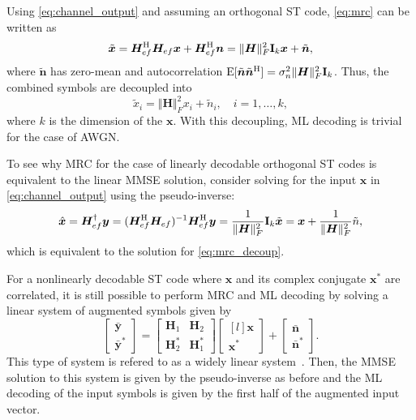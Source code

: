 Using \eqref{eq:channel_output} and assuming an orthogonal ST code, \eqref{eq:mrc} can be written as
\[ \tilde{\bm{x}} = \bm{H}_{ef}^\text{H}\bm{H}_{ef}\bm{x} + \bm{H}_{ef}^\text{H}\bm{n} = \Vert\bm{H}\Vert_F^2 \mathbf{I}_k \bm{x} + \tilde{\bm{n}}, \]
where $\tilde{\bm{n}}$ has zero-mean and autocorrelation $\operatorname{E}[\tilde{\bm{n}}\tilde{\bm{n}}^\text{H}] = \sigma_n^2\Vert\bm{H}\Vert_F^2\mathbf{I}_k$. Thus, the combined symbols are decoupled into
\begin{equation}
  \tilde{x}_i = \Vert\bm{H}\Vert_F^2 x_i + \tilde{n}_i, \quad i=1,\dots,k,
  \label{eq:mrc_decoup}
\end{equation}
where $k$ is the dimension of the $\bm{x}$. With this decoupling, ML decoding is trivial for the case of AWGN.

To see why MRC for the case of linearly decodable orthogonal ST codes is equivalent to the linear MMSE solution, consider solving for the input $\bm{x}$ in \eqref{eq:channel_output} using the pseudo-inverse:
\[ \hat{\bm{x}} = \bm{H}_{ef}^\dagger \bm{y} = (\bm{H}_{ef}^\text{H}\bm{H}_{ef})^{-1}\bm{H}_{ef}^\text{H} \bm{y} = \frac{1}{\Vert\bm{H}\Vert_F^2} \mathbf{I}_k \tilde{\bm{x}} = \bm{x} + \frac{1}{\Vert\bm{H}\Vert_F^2} \tilde{n}, \]
which is equivalent to the solution for \eqref{eq:mrc_decoup}.

For a nonlinearly decodable ST code where $\bm{x}$ and its complex conjugate $\bm{x}^\ast$ are correlated, it is still possible to perform MRC and ML decoding by solving a linear system of augmented symbols given by
\[ \begin{bmatrix} \bar{\bm{y}} \\ \bar{\bm{y}}^\ast \end{bmatrix}
= \begin{bmatrix} \bm{H}_1 & \bm{H}_2 \\ \bm{H}_2^\ast & \bm{H}_1^\ast \end{bmatrix}
\begin{bmatrix*}[l] \bm{x} \\ \bm{x}^\ast\end{bmatrix*} + \begin{bmatrix} \bar{\bm{n}} \\ \bar{\bm{n}}^\ast \end{bmatrix} . \]
This type of system is refered to as a widely linear system~\cite{dama13,picinbono95}. Then, the MMSE solution to this system is given by the pseudo-inverse as before and the ML decoding of the input symbols is given by the first half of the augmented input vector.

